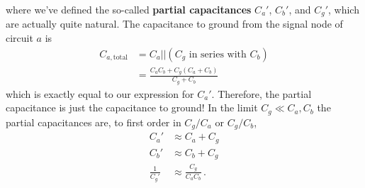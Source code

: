 where we've defined the so-called \textbf{partial capacitances} $C_a'$, $C_b'$, and $C_g'$, which are actually quite natural.
The capacitance to ground from the signal node of circuit $a$ is
\begin{align*}
  C_{a, \text{total}}
  &= C_a || (C_g \text{ in series with } C_b) \\
  &= \frac{C_a C_b + C_g(C_a+C_b)}{C_g+C_b}
\end{align*}
which is exactly equal to our expression for $C_a'$.
Therefore, the partial capacitance is just the capacitance to ground!
In the limit $C_g \ll C_a, C_b$ the partial capacitances are, to first order in $C_g / C_a$ or $C_g / C_b$,
\begin{align*}
  C_a' & \approx C_a + C_g \\
  C_b' & \approx C_b + C_g \\
  \frac{1}{C_g'} & \approx \frac{C_g}{C_a C_b} \, .
\end{align*}

